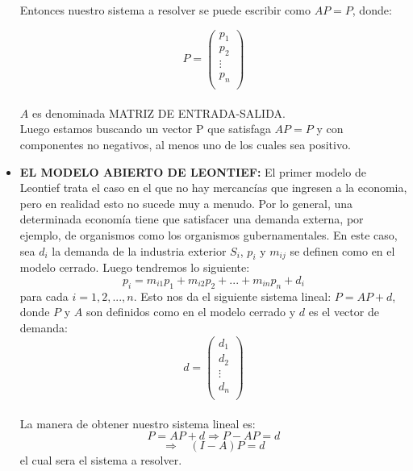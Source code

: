 \documentclass[10pt,a4paper]{article}
\begin{document}
\begin{multicols}{2}
\begin{itemize}
Entonces nuestro sistema a resolver se puede escribir como $AP = P$, donde:
	
 \[ P =
\left( \begin{array}{cccc}
p_{1} \\ 
p_{2} \\ 
\vdots  \\
p_{n} \\ 
\end{array} \right) \]\\
 $A$ es denominada MATRIZ DE ENTRADA-SALIDA.\\
 Luego estamos buscando un vector P que satisfaga $AP = P$ y con componentes no negativos, al menos uno de los cuales sea positivo.\\
 
 \item{\textbf{EL MODELO ABIERTO DE LEONTIEF: }}El primer modelo de Leontief trata el caso en el que no hay mercancías que ingresen a la economia, pero en realidad esto no sucede muy a menudo. Por lo general, una determinada economía tiene que satisfacer una demanda externa, por ejemplo, de organismos como los organismos gubernamentales. En este caso, sea $d_{i}$ la demanda de la industria exterior $S_i$, $p_{i}$ y $m_{ij}$ se definen como en el modelo cerrado. Luego tendremos lo siguiente:
 $$ p_{i} = m_{i1}p_{1} + m_{i2}p_{2} + ... + m_{in}p_{n} + d_{i}$$
 para cada $i=1,2,...,n$. Esto nos da el siguiente sistema lineal:  $P = AP + d$, donde $P$ y $A$ son definidos como en el modelo cerrado y $d$ es el vector de demanda:\\
 	\[ d =
 	\left( \begin{array}{cccc}
 	d_{1} \\
 	d_{2} \\ 
 	\vdots  \\
 	d_{n} \\ 
 	\end{array} \right) \]\\
 	
 La manera de obtener nuestro sistema lineal es:
 	$$ P = AP +d \Rightarrow P-AP = d$$
 	\begin{equation}\label{ecu1}
 		\Rightarrow \ \ \ \ (I-A)P = d
 	\end{equation}
 	el cual sera el sistema a resolver.
 

\end{itemize}
\end{multicols}
\end{document}

